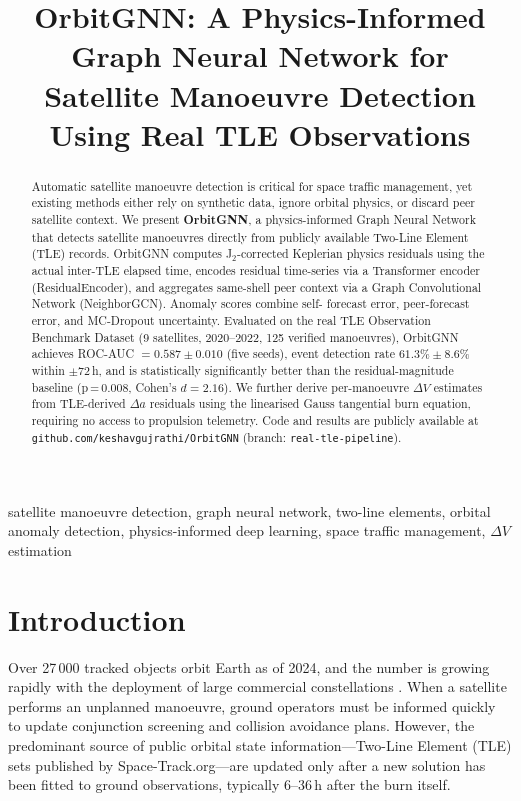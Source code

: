 \documentclass[conference]{IEEEtran}
\title{OrbitGNN: A Physics-Informed Graph Neural Network for\\
Satellite Manoeuvre Detection Using Real TLE Observations}
\author{
  \IEEEauthorblockN{[MEMBER 1]\textsuperscript{1},
                    [MEMBER 2]\textsuperscript{1},
                    [MEMBER 3]\textsuperscript{1}}
  \IEEEauthorblockA{\textsuperscript{1}[DEPARTMENT],
                    [INSTITUTION]\\
                    [CITY, COUNTRY]\\
                    Email: [email@domain]}
  \and
  \IEEEauthorblockN{[GUIDE NAME]\textsuperscript{1}}
  \IEEEauthorblockA{\textsuperscript{1}[DEPARTMENT],
                    [INSTITUTION]\\
                    [CITY, COUNTRY]}
}
\begin{document}
\maketitle

\begin{abstract}
Automatic satellite manoeuvre detection is critical for space traffic
management, yet existing methods either rely on synthetic data, ignore
orbital physics, or discard peer satellite context. We present
\textbf{OrbitGNN}, a physics-informed Graph Neural Network that
detects satellite manoeuvres directly from publicly available
Two-Line Element (TLE) records. OrbitGNN computes J$_2$-corrected
Keplerian physics residuals using the actual inter-TLE elapsed time,
encodes residual time-series via a Transformer encoder
(ResidualEncoder), and aggregates same-shell peer context via a Graph
Convolutional Network (NeighborGCN). Anomaly scores combine self-
forecast error, peer-forecast error, and MC-Dropout uncertainty.
Evaluated on the real TLE Observation Benchmark Dataset \cite{shorten2023}
(9 satellites, 2020--2022, 125 verified manoeuvres), OrbitGNN achieves
ROC-AUC $= 0.587 \pm 0.010$ (five seeds), event detection rate
$61.3\% \pm 8.6\%$ within $\pm72$\,h, and is statistically significantly
better than the residual-magnitude baseline (p\,=\,0.008, Cohen's
$d = 2.16$). We further derive per-manoeuvre $\Delta V$ estimates from
TLE-derived $\Delta a$ residuals using the linearised Gauss tangential
burn equation, requiring no access to propulsion telemetry.
Code and results are publicly available at
\texttt{github.com/keshavgujrathi/OrbitGNN} (branch: \texttt{real-tle-pipeline}).
\end{abstract}

\begin{IEEEkeywords}
satellite manoeuvre detection, graph neural network, two-line elements,
orbital anomaly detection, physics-informed deep learning, space
traffic management, $\Delta V$ estimation
\end{IEEEkeywords}

\section{Introduction}
\label{sec:intro}

Over 27\,000 tracked objects orbit Earth as of 2024, and the number is
growing rapidly with the deployment of large commercial constellations
\cite{vallado2013}. When a satellite performs an unplanned manoeuvre,
ground operators must be informed quickly to update conjunction
screening and collision avoidance plans. However, the predominant
source of public orbital state information---Two-Line Element (TLE)
sets published by Space-Track.org---are updated only after a new
solution has been fitted to ground observations, typically 6--36\,h
after the burn itself.
\end{document}
